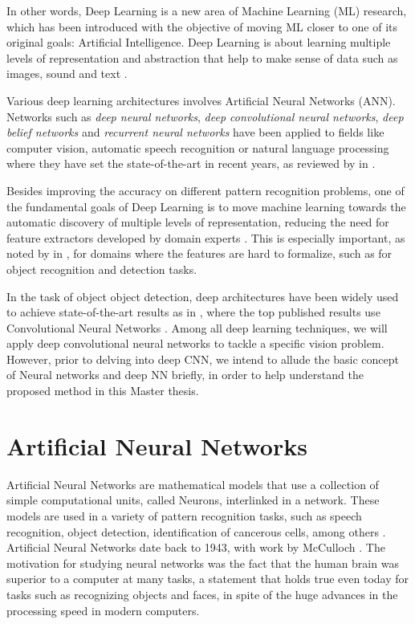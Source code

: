 In other words,  Deep Learning is a new area of Machine Learning (ML) research, which has been introduced with the objective of moving ML closer to one of its original goals: Artificial Intelligence. Deep Learning is about learning multiple levels of representation and abstraction that help to make sense of data such as images, sound and text \cite{tutorial2014lisa}.  

Various deep learning architectures involves Artificial Neural Networks (ANN). Networks such as \textit{deep neural networks}, \textit{deep convolutional neural networks},\textit{ deep belief networks} and \textit{recurrent neural networks} have been applied to fields like computer vision, automatic speech recognition or natural language processing where they have set the state-of-the-art in recent years, as reviewed by \citeauthor{bengio2009learning} in \cite{bengio2009learning, bengio2013deep}. 

Besides improving the accuracy on different pattern recognition problems, one of the fundamental goals of Deep Learning is to move machine learning towards the automatic discovery of multiple levels of representation, reducing the need for feature extractors developed by domain experts \cite{bengio2013deep}. This is especially important, as noted by \citeauthor{bengio2009learning} in \cite{bengio2009learning}, for domains where the features are hard to formalize, such as for object recognition and detection tasks.

In the task of object object detection, deep architectures have been widely used to achieve state-of-the-art results as in \cite{krizhevsky2009learning,krizhevsky2012imagenet}, where the top published results use Convolutional Neural Networks \cite{ciresan2012multi}. Among all deep learning techniques, we will apply deep convolutional neural networks to tackle a specific vision problem. However, prior to delving into deep CNN, we intend to allude the basic concept of Neural networks and deep NN briefly, in order to help understand the proposed method in this Master thesis.

\section{Artificial Neural Networks}

Artificial Neural Networks are mathematical models that use a collection of simple computational units, called Neurons, interlinked in a network. These models are used in a variety of pattern recognition tasks, such as speech recognition, object detection, identification of cancerous cells, among others \cite{hertz1991introduction}. Artificial Neural Networks date back to 1943, with work by McCulloch \cite{mcculloch1943logical}. The motivation for studying neural networks was the fact that the human brain was superior to a computer at many tasks, a statement that holds true even today for tasks such as recognizing objects and faces, in spite of the huge advances in the processing speed in modern computers.

